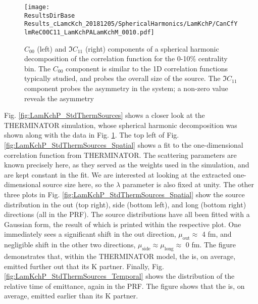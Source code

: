 \documentclass[/home/jesse/Analysis/FemtoAnalysis/AnalysisNotes/AnalysisNoteJBuxton.tex]{subfiles}
\begin{document}
\begin{figure}[h!]
  \centering
  \texttt{[image: \\ResultsDirBase Results\_cLamcKch\_20181205/SphericalHarmonics/LamKchP/CanCfYlmReC00C11\_LamKchPALamKchM\_0010.pdf]}
  \caption[\LamKchP $C_{00}$ and $\Im C_{11}$ Spherical Harmonic Components (0-10\%)]{$C_{00}$ (left) and $\Im C_{11}$ (right) components of a spherical harmonic decomposition of the \LamKchP correlation function for the 0-10\% centrality bin.  
The $C_{00}$ component is similar to the 1D correlation functions typically studied, and probes the overall size of the source.
The $\Im C_{11}$ component probes the asymmetry in the system; a non-zero value reveals the asymmetry}
  \label{fig:LamKchP_ReC00C11_0010}
\end{figure}


Fig. \ref{fig:LamKchP_StdThermSources} shows a closer look at the THERMINATOR simulation, whose spherical harmonic decomposition was shown along with the data in Fig. \ref{fig:LamKchP_ReC00C11_0010}.
The top left of Fig. \ref{fig:LamKchP_StdThermSources_Spatial} shows a fit to the one-dimensional correlation function from THERMINATOR.
The scattering parameters are known precisely here, as they served as the weights used in the simulation, and are kept constant in the fit.
We are interested at looking at the extracted one-dimensional source size here, so the $\lambda$ parameter is also fixed at unity.
The other three plots in Fig. \ref{fig:LamKchP_StdThermSources_Spatial} show the source distribution in the out (top right), side (bottom left), and long (bottom right) directions (all in the PRF).
The source distributions have all been fitted with a Gaussian form, the result of which is printed within the respective plot.
One immediately sees a significant shift in the out direction, $\mu_{\mathrm{out}} \approx$ 4 fm, and negligible shift in the other two directions, $\mu_{\mathrm{side}} \approx \mu_{\mathrm{long}} \approx$ 0 fm.
The figure demonstrates that, within the THERMINATOR model, the \Lam is, on average, emitted further out that its K partner.
Finally, Fig. \ref{fig:LamKchP_StdThermSources_Temporal} shows the distribution of the relative time of emittance, again in the PRF.
The figure shows that the \Lam is, on average, emitted earlier than its K partner.
\end{document}
